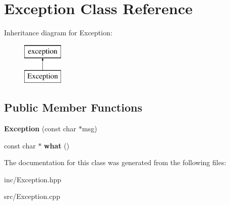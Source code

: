 \hypertarget{class_exception}{}\section{Exception Class Reference}
\label{class_exception}
Inheritance diagram for Exception\+:\begin{figure}[H]
\begin{center}
\leavevmode
\includegraphics[height=2.000000cm]{class_exception}
\end{center}
\end{figure}
\subsection*{Public Member Functions}
\begin{DoxyCompactItemize}
\item 
\mbox{\label{class_exception_a024d3acad826f88c249b8969f90ebb5b}} 
{\bfseries Exception} (const char $\ast$msg)
\item 
\mbox{\label{class_exception_a13c431600678afff2c9bd596ec97d2ee}} 
const char $\ast$ {\bfseries what} ()
\end{DoxyCompactItemize}


The documentation for this class was generated from the following files\+:\begin{DoxyCompactItemize}
\item 
inc/Exception.\+hpp\item 
src/Exception.\+cpp\end{DoxyCompactItemize}
